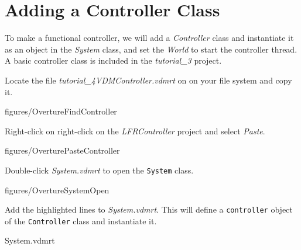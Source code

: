 \documentclass[11pt,a4paper]{../tutorial}
\begin{document}
\newpage
\section{Adding a Controller Class}

To make a functional controller, we will add a \emph{Controller} class and instantiate it as an object in the \emph{System} class, and set the \emph{World} to start the controller thread. A basic controller class is included in the \emph{tutorial\_3} project.

\begin{instructions}
\item Locate the file \emph{tutorial\_4\pathsep{}VDM\pathsep{}Controller.vdmrt} on on your file system and copy it.

    \begin{annotation}[width=0.8\linewidth]{figures/OvertureFindController}
    \end{annotation}

\item Right-click on right-click on the \emph{LFRController} project and select \emph{Paste}.

    \begin{annotation}[width=0.99\linewidth,trim=0 335 0 0,clip]{figures/OverturePasteController}
    \end{annotation}

\item Double-click \emph{System.vdmrt} to open the \texttt{System} class.

    \begin{annotation}[width=0.98\linewidth,trim=0 335 0 0,clip]{figures/OvertureSystemOpen}
    \end{annotation}

\newpage
\item \label{step:system} Add the highlighted lines to \emph{System.vdmrt}. This will define a \texttt{controller} object of the \texttt{Controller} class and instantiate it.

    \bigskip
    
    {System.vdmrt}


\end{instructions}
\end{document}
